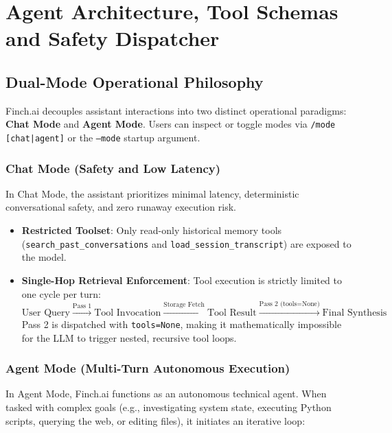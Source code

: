 \chapter{Agent Architecture, Tool Schemas and Safety Dispatcher}
\label{chap:agent_mode}

\section{Dual-Mode Operational Philosophy}
Finch.ai decouples assistant interactions into two distinct operational paradigms: \textbf{Chat Mode} and \textbf{Agent Mode}. Users can inspect or toggle modes via \texttt{/mode [chat|agent]} or the \texttt{--mode} startup argument.

\subsection{Chat Mode (Safety and Low Latency)}
In Chat Mode, the assistant prioritizes minimal latency, deterministic conversational safety, and zero runaway execution risk.
\begin{itemize}
    \item \textbf{Restricted Toolset}: Only read-only historical memory tools (\texttt{search\_past\_conversations} and \texttt{load\_session\_transcript}) are exposed to the model.
    \item \textbf{Single-Hop Retrieval Enforcement}: Tool execution is strictly limited to one cycle per turn:
    \begin{equation}
        \text{User Query} \xrightarrow{\text{Pass 1}} \text{Tool Invocation} \xrightarrow{\text{Storage Fetch}} \text{Tool Result} \xrightarrow{\text{Pass 2 (tools=None)}} \text{Final Synthesis}
    \end{equation}
    Pass 2 is dispatched with \texttt{tools=None}, making it mathematically impossible for the LLM to trigger nested, recursive tool loops.
\end{itemize}

\subsection{Agent Mode (Multi-Turn Autonomous Execution)}
In Agent Mode, Finch.ai functions as an autonomous technical agent. When tasked with complex goals (e.g., investigating system state, executing Python scripts, querying the web, or editing files), it initiates an iterative loop:

